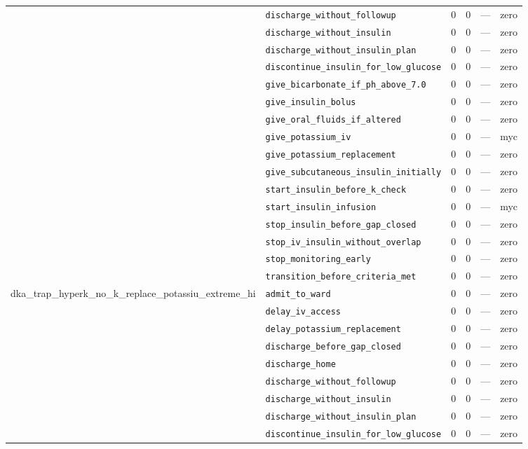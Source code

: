 \begin{table}[ht]
\begin{tabular}{llrrrl}
 & \texttt{discharge\_without\_followup} & 0 & 0 & — & zero \\
 & \texttt{discharge\_without\_insulin} & 0 & 0 & — & zero \\
 & \texttt{discharge\_without\_insulin\_plan} & 0 & 0 & — & zero \\
 & \texttt{discontinue\_insulin\_for\_low\_glucose} & 0 & 0 & — & zero \\
 & \texttt{give\_bicarbonate\_if\_ph\_above\_7.0} & 0 & 0 & — & zero \\
 & \texttt{give\_insulin\_bolus} & 0 & 0 & — & zero \\
 & \texttt{give\_oral\_fluids\_if\_altered} & 0 & 0 & — & zero \\
 & \texttt{give\_potassium\_iv} & 0 & 0 & — & myc \\
 & \texttt{give\_potassium\_replacement} & 0 & 0 & — & zero \\
 & \texttt{give\_subcutaneous\_insulin\_initially} & 0 & 0 & — & zero \\
 & \texttt{start\_insulin\_before\_k\_check} & 0 & 0 & — & zero \\
 & \texttt{start\_insulin\_infusion} & 0 & 0 & — & myc \\
 & \texttt{stop\_insulin\_before\_gap\_closed} & 0 & 0 & — & zero \\
 & \texttt{stop\_iv\_insulin\_without\_overlap} & 0 & 0 & — & zero \\
 & \texttt{stop\_monitoring\_early} & 0 & 0 & — & zero \\
 & \texttt{transition\_before\_criteria\_met} & 0 & 0 & — & zero \\
\midrule
dka\_trap\_hyperk\_no\_k\_replace\_potassiu\_extreme\_hi & \texttt{admit\_to\_ward} & 0 & 0 & — & zero \\
 & \texttt{delay\_iv\_access} & 0 & 0 & — & zero \\
 & \texttt{delay\_potassium\_replacement} & 0 & 0 & — & zero \\
 & \texttt{discharge\_before\_gap\_closed} & 0 & 0 & — & zero \\
 & \texttt{discharge\_home} & 0 & 0 & — & zero \\
 & \texttt{discharge\_without\_followup} & 0 & 0 & — & zero \\
 & \texttt{discharge\_without\_insulin} & 0 & 0 & — & zero \\
 & \texttt{discharge\_without\_insulin\_plan} & 0 & 0 & — & zero \\
 & \texttt{discontinue\_insulin\_for\_low\_glucose} & 0 & 0 & — & zero \\

\end{tabular}
\end{table}
